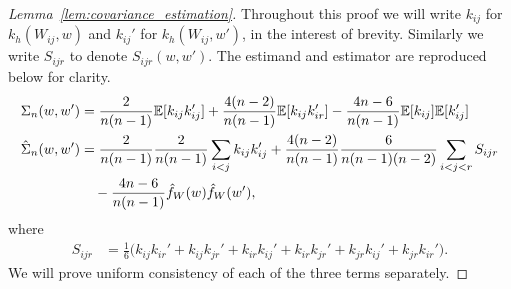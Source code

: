\begin{proof}[Lemma~\ref{lem:covariance_estimation}]

  Throughout this proof we will write
  $k_{i j}$ for $k_h(W_{i j},w)$ and
  $k_{i j}'$ for $k_h(W_{i j},w')$,
  in the interest of brevity.
  Similarly we write $S_{i j r}$ to denote $S_{i j r}(w,w')$.
  The estimand and estimator are reproduced below for clarity.
  \begin{align*}
    \Sigma_n(w,w')
    &=
    \frac{2}{n(n-1)}
    \mathbb{E}[k_{i j} k_{i j}']
    + \frac{4(n-2)}{n(n-1)}
    \mathbb{E}[k_{i j} k_{i r}']
    - \frac{4n-6}{n(n-1)}
    \mathbb{E}[k_{i j}]
    \mathbb{E}[k_{i j}'] \\
    \hat \Sigma_n(w,w')
    &=
    \frac{2}{n(n-1)}
    \frac{2}{n(n-1)}
    \sum_{i<j}
    k_{i j}
    k_{i j}'
    +
    \frac{4(n-2)}{n(n-1)}
    \frac{6}{n(n-1)(n-2)}
    \sum_{i<j<r}
    S_{i j r} \\
    &\quad-
    \frac{4n-6}{n(n-1)}
    \hat f_W(w)
    \hat f_W(w'),
  \end{align*}
  where
  \begin{align*}
    S_{i j r}
    &=
    \frac{1}{6}
    \Big(
      k_{i j}
      k_{i r}'
      + k_{i j}
      k_{jr}'
      + k_{i r}
      k_{i j}'
      + k_{i r}
      k_{jr}'
      + k_{jr}
      k_{i j}'
      + k_{jr}
      k_{i r}'
    \Big).
  \end{align*}
  We will prove uniform consistency of each of the three terms separately.



\end{proof}
